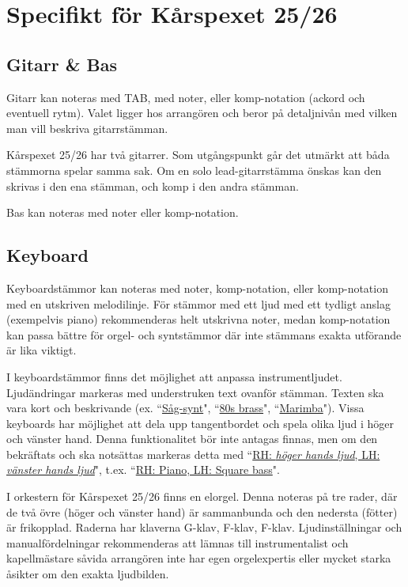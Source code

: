 \chapter{Specifikt för Kårspexet 25/26}
\section{Gitarr \& Bas}
Gitarr kan noteras med TAB, med noter, eller komp-notation (ackord och eventuell rytm). Valet ligger hos arrangören och beror på detaljnivån med vilken man vill beskriva gitarrstämman. 

Kårspexet 25/26 har två gitarrer. Som utgångspunkt går det utmärkt att båda stämmorna spelar samma sak. Om en solo lead-gitarrstämma önskas kan den skrivas i den ena stämman, och komp i den andra stämman.

Bas kan noteras med noter eller komp-notation.


\section{Keyboard}
Keyboardstämmor kan noteras med noter, komp-notation, eller komp-notation med en utskriven melodilinje. För stämmor med ett ljud med ett tydligt anslag (exempelvis piano) rekommenderas helt utskrivna noter, medan komp-notation kan passa bättre för orgel- och syntstämmor där inte stämmans exakta utförande är lika viktigt.


I keyboardstämmor finns det möjlighet att anpassa instrumentljudet. Ljudändringar markeras med understruken text ovanför stämman. Texten ska vara kort och beskrivande (ex. ``\underline{Såg-synt}", ``\underline{80s brass}", ``\underline{Marimba}"). Vissa keyboards har möjlighet att dela upp tangentbordet och spela olika ljud i höger och vänster hand. Denna funktionalitet bör inte antagas finnas, men om den bekräftats och ska notsättas markeras detta med ``\underline{RH: \textit{höger hands ljud}, LH: \textit{vänster hands ljud}}", t.ex. ``\underline{RH: Piano, LH: Square bass}".

\vspace{1em}
I orkestern för Kårspexet 25/26 finns en elorgel. Denna noteras på tre rader, där de två övre (höger och vänster hand) är sammanbunda och den nedersta (fötter) är frikopplad. Raderna har klaverna G-klav, F-klav, F-klav. Ljudinställningar och manualfördelningar rekommenderas att lämnas till instrumentalist och kapellmästare såvida arrangören inte har egen orgelexpertis eller mycket starka åsikter om den exakta ljudbilden. 

